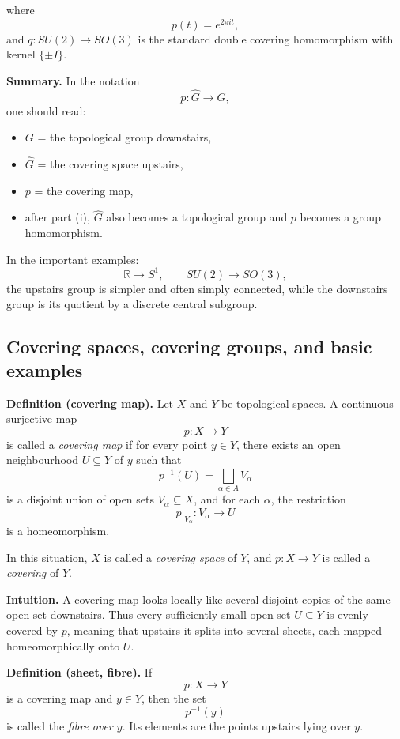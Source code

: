 \documentclass[12pt,a4paper]{article}
\theoremstyle{notespace}
\begin{document}
where
\[
p(t)=e^{2\pi i t},
\]
and \(q:SU(2)\to SO(3)\) is the standard double covering homomorphism with kernel \(\{\pm I\}\).

\medskip

\textbf{Summary.}
In the notation
\[
p:\widehat{G}\to G,
\]
one should read:

\begin{itemize}
	\item \(G\) = the topological group downstairs,
	\item \(\widehat{G}\) = the covering space upstairs,
	\item \(p\) = the covering map,
	\item after part (i), \(\widehat{G}\) also becomes a topological group and \(p\) becomes a group homomorphism.
\end{itemize}

In the important examples:
\[
\mathbb R \to S^1,
\qquad
SU(2)\to SO(3),
\]
the upstairs group is simpler and often simply connected, while the downstairs group is its quotient by a discrete central subgroup.


\subsection{Covering spaces, covering groups, and basic examples}

\textbf{Definition (covering map).}
Let \(X\) and \(Y\) be topological spaces. A continuous surjective map
\[
p:X\to Y
\]
is called a \emph{covering map} if for every point \(y\in Y\), there exists an open neighbourhood \(U\subseteq Y\) of \(y\) such that
\[
p^{-1}(U)=\bigsqcup_{\alpha\in A} V_\alpha
\]
is a disjoint union of open sets \(V_\alpha\subseteq X\), and for each \(\alpha\), the restriction
\[
p|_{V_\alpha}:V_\alpha\to U
\]
is a homeomorphism.

In this situation, \(X\) is called a \emph{covering space} of \(Y\), and \(p:X\to Y\) is called a \emph{covering} of \(Y\).

\medskip

\textbf{Intuition.}
A covering map looks locally like several disjoint copies of the same open set downstairs. Thus every sufficiently small open set \(U\subseteq Y\) is evenly covered by \(p\), meaning that upstairs it splits into several sheets, each mapped homeomorphically onto \(U\).

\medskip

\textbf{Definition (sheet, fibre).}
If
\[
p:X\to Y
\]
is a covering map and \(y\in Y\), then the set
\[
p^{-1}(y)
\]
is called the \emph{fibre over \(y\)}. Its elements are the points upstairs lying over \(y\).
\end{document}
